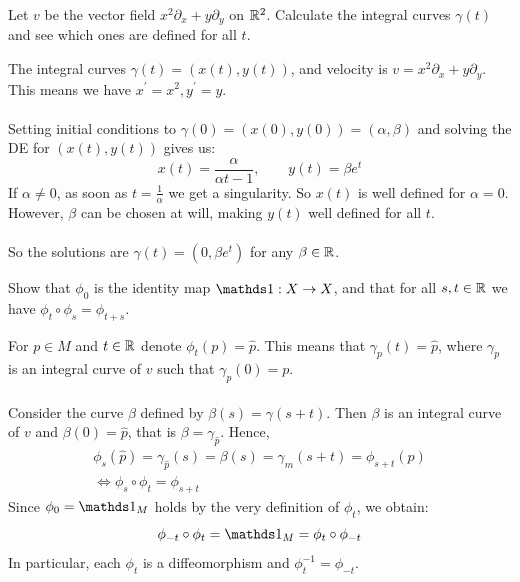 \documentclass[10pt]{article}
\begin{document}
\begin{example}
	Let $v$ be the vector field $x^2\partial_x + y\partial_y$ on $\mathbb{R}^2$. Calculate
	the integral curves $\gamma(t)$ and see which ones are defined for all $t$.
\end{example}
\sol The integral curves $\gamma(t) = (x(t),y(t))$, and velocity is $v = x^2\partial_x + y\partial_y$. This means we have $x^\prime = x^2, y^\prime = y$.\\\\
Setting initial conditions to $\gamma(0) = (x(0),y(0)) = (\alpha,\beta)$ and solving the DE for $(x(t),y(t))$ gives us:
$$
	x(t) = \frac{\alpha}{\alpha t - 1}, \qquad y(t)=\beta e^t
$$
If $\alpha \ne 0$, as soon as $t = \frac{1}{\alpha}$ we get a singularity. So $x(t)$ is well defined for $\alpha = 0$. However, $\beta$ can be chosen at will, making $y(t)$ well defined for all $t$.\\\\
So the solutions are $\gamma(t) = (0,\beta e^t)$ for any $\beta \in \mathbb{R}$.


\begin{example}
	Show that $\phi_0$ is the identity map $\id:X\to X$, and that for all $s,t\in\mathbb{R}$
	we have $\phi_t\circ\phi_s=\phi_{t+s}$.
\end{example}
\sol For $p \in M$ and $t \in \mathbb{R}$ denote $\phi_t(p) = \hat{p}$. This means that $\gamma_p(t) = \hat{p}$, where $\gamma_p$ is an integral curve of $v$ such that $\gamma_p(0)=p$.\\\\
Consider the curve $\beta$ defined by $\beta(s)=\gamma(s+t)$. Then $\beta$ is an integral curve of $v$ and $\beta(0)=\hat{p}$, that is $\beta=\gamma_{\hat{p}}$. Hence,
$$
\begin{aligned}
	\phi_s(\hat{p}) = \gamma_{\hat{p}}(s) = \beta(s) = \gamma_m(s+t) = \phi_{s+t}(p)\\
	\Longleftrightarrow \phi_s \circ \phi_t = \phi_{s+t}
\end{aligned}
$$
Since $\phi_0 = \id_M$ holds by the very definition of $\phi_t$, we obtain:
$$
\phi_{-t} \circ \phi_t = \id_M = \phi_t  \circ \phi_{-t}
$$
In particular, each $\phi_t$ is a diffeomorphism and $\phi_t^{-1} = \phi_{-t}$.
\end{document}

